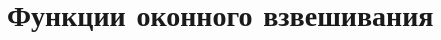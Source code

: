 \hypertarget{group___w_i_n___g_r_o_u_p}{}\section{Функции оконного взвешивания}
\label{group___w_i_n___g_r_o_u_p}
